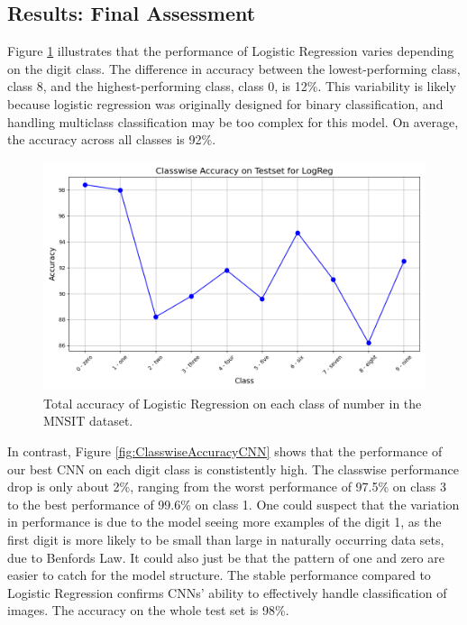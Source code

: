 \subsection{Results: Final Assessment}

Figure \ref{fig:ClasswiseAccuracyLogReg} illustrates that the performance of Logistic Regression varies depending on the digit class. The difference in accuracy between the lowest-performing class, class 8, and the highest-performing class, class 0, is 12\%. This variability is likely because logistic regression was originally designed for binary classification, and handling multiclass classification may be too complex for this model. On average, the accuracy across all classes is 92\%.

\begin{figure}[H]
    \centering
    \includegraphics[width=\textwidth]{results/evaluation/LogReg_classwise_acc.png}
    \caption{Total accuracy of Logistic Regression on each class of number in the MNSIT dataset.}
    \label{fig:ClasswiseAccuracyLogReg}
\end{figure}
In contrast, Figure \ref{fig:ClasswiseAccuracyCNN} shows that the performance of our best CNN on each digit class is constistently high. The classwise performance drop is only about 2\%, ranging from the worst performance of 97.5\% on class 3 to the best performance of 99.6\% on class 1. One could suspect that the variation in performance is due to the model seeing more examples of the digit 1, as the first digit is more likely to be small than large in naturally occurring data sets, due to Benfords Law. It could also just be that the pattern of one and zero are easier to catch for the model structure. The stable performance compared to Logistic Regression confirms CNNs' ability to effectively handle classification of images. The accuracy on the whole test set is 98\%.
